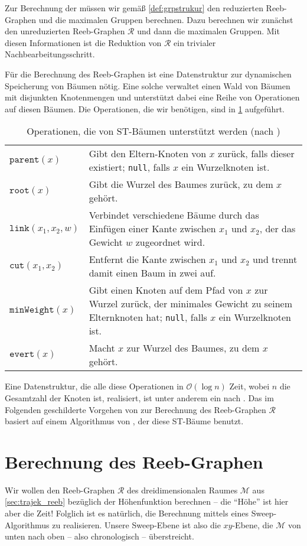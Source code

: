 Zur Berechnung der \GrpStruktur müssen wir gemäß \cref{def:grpstrukur} den reduzierten Reeb-Graphen und die maximalen Gruppen berechnen.
Dazu berechnen wir zunächst den unreduzierten Reeb-Graphen $\mathcal{R}$ und dann die maximalen Gruppen. 
Mit diesen Informationen ist die Reduktion von $\mathcal{R}$ ein trivialer Nachbearbeitungsschritt.

Für die Berechnung des Reeb-Graphen ist eine Datenstruktur zur dynamischen Speicherung von Bäumen nötig.
Eine solche verwaltet einen Wald von Bäumen mit disjunkten Knotenmengen und unterstützt dabei eine Reihe von Operationen auf diesen Bäumen.
Die Operationen, die wir benötigen, sind in \cref{tbl:operationenST} aufgeführt.
\begin{table}[p]
	\Centering
	\caption{Operationen, die von ST-Bäumen unterstützt werden (nach \cite{parsaReeb})}\label{tbl:operationenST}
	\begin{tabular}{lp{}}
		\toprule
		$\mathtt{parent}(x)$ & Gibt den Eltern-Knoten von $x$ zurück, falls dieser existiert; \texttt{null}, falls $x$ ein Wurzelknoten ist.\\
		$\mathtt{root}(x)$ & Gibt die Wurzel des Baumes zurück, zu dem $x$ gehört.\\
		$\mathtt{link}(x_1,x_2,w)$ & Verbindet verschiedene Bäume durch das Einfügen einer Kante zwischen $x_1$ und $x_2$, der das Gewicht $w$ zugeordnet wird.\\
		$\mathtt{cut}(x_1,x_2)$ & Entfernt die Kante zwischen $x_1$ und $x_2$ und trennt damit einen Baum in zwei auf.\\
		$\mathtt{minWeight}(x)$ & Gibt einen Knoten auf dem Pfad von $x$ zur Wurzel zurück, der minimales Gewicht zu seinem Elternknoten hat; \texttt{null}, falls $x$ ein Wurzelknoten ist.\\
		$\mathtt{evert}(x)$ & Macht $x$ zur Wurzel des Baumes, zu dem $x$ gehört.\\
		\bottomrule
	\end{tabular}
\end{table}
Eine Datenstruktur, die alle diese Operationen in $\mathcal{O}(\log n)$ Zeit, wobei $n$ die Gesamtzahl der Knoten ist, realisiert, ist unter anderem ein  nach \textcite{dynamictrees}.
Das im Folgenden geschilderte Vorgehen von \textcite{buchin2015} zur Berechnung des Reeb-Graphen $\mathcal{R}$ basiert auf einem Algorithmus von \textcite{parsaReeb}, der diese ST-Bäume benutzt.

\section{Berechnung des Reeb-Graphen} %
\label{sec:berechnung_reeb}
Wir wollen den Reeb-Graphen $\mathcal{R}$ des dreidimensionalen Raumes $\mathcal{M}$ aus \cref{sec:trajek_reeb} bezüglich der Höhenfunktion berechnen -- die \enquote{Höhe} ist hier aber die Zeit! 
Folglich ist es natürlich, die Berechnung mittels eines Sweep-Algorithmus zu realisieren.
Unsere Sweep-Ebene ist also die $xy$-Ebene, die $\mathcal{M}$ von unten nach oben -- also chronologisch -- überstreicht.

